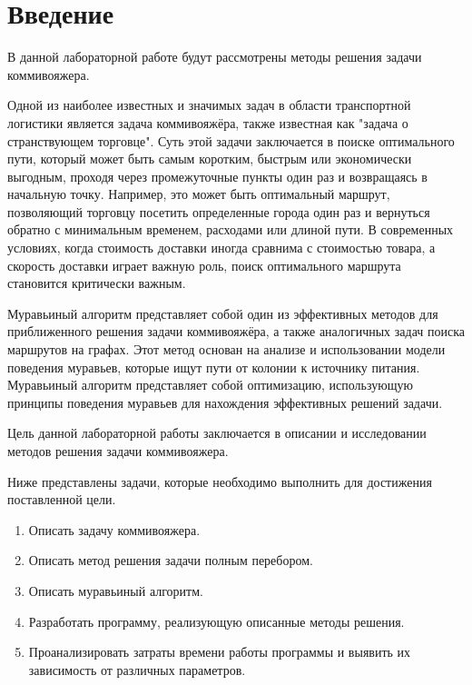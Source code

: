 \chapter*{Введение}

В данной лабораторной работе будут рассмотрены методы решения задачи коммивояжера.

Одной из наиболее известных и значимых задач в области транспортной логистики является задача коммивояжёра, также известная как "задача о странствующем торговце". 
Суть этой задачи заключается в поиске оптимального пути, который может быть самым коротким, быстрым или экономически выгодным, проходя через промежуточные пункты один раз и возвращаясь в начальную точку. \cite{task} 
Например, это может быть оптимальный маршрут, позволяющий торговцу посетить определенные города один раз и вернуться обратно с минимальным временем, расходами или длиной пути. 
В современных условиях, когда стоимость доставки иногда сравнима с стоимостью товара, а скорость доставки играет важную роль, поиск оптимального маршрута становится критически важным.

Муравьиный алгоритм представляет собой один из эффективных методов для приближенного решения задачи коммивояжёра, а также аналогичных задач поиска маршрутов на графах. 
Этот метод основан на анализе и использовании модели поведения муравьев, которые ищут пути от колонии к источнику питания. 
Муравьиный алгоритм представляет собой оптимизацию, использующую принципы поведения муравьев для нахождения эффективных решений задачи.

Цель данной лабораторной работы заключается в описании и исследовании методов решения задачи коммивояжера.

Ниже представлены задачи, которые необходимо выполнить для достижения поставленной цели.
\begin{enumerate}
\item Описать задачу коммивояжера.
\item Описать метод решения задачи полным перебором.
\item Описать муравьиный алгоритм.
\item Разработать программу, реализующую описанные методы решения.
\item Проанализировать затраты времени работы программы и выявить их зависимость от различных параметров.
\end{enumerate}